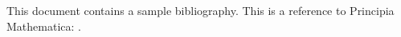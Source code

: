 \documentclass{article}
\begin{document}
This document contains a sample bibliography.
This is a reference to Principia Mathematica: \cite{PrincipiaMathematica:1927}.



\end{document}
